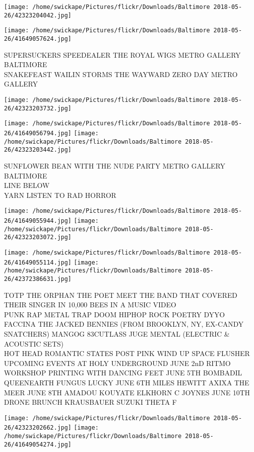 \documentclass[10pt,letterpaper]{article}
\begin{document}
\texttt{[image: /home/swickape/Pictures/flickr/Downloads/Baltimore 2018-05-26/42323204042.jpg]}

\vspace{0.25in}
\texttt{[image: /home/swickape/Pictures/flickr/Downloads/Baltimore 2018-05-26/41649057624.jpg]}

SUPERSUCKERS SPEEDEALER THE ROYAL WIGS METRO GALLERY BALTIMORE\\
SNAKEFEAST WAILIN STORMS THE WAYWARD ZERO DAY METRO GALLERY
\pagebreak

\texttt{[image: /home/swickape/Pictures/flickr/Downloads/Baltimore 2018-05-26/42323203732.jpg]}

\vspace{0.25in}
\texttt{[image: /home/swickape/Pictures/flickr/Downloads/Baltimore 2018-05-26/41649056794.jpg]}
\texttt{[image: /home/swickape/Pictures/flickr/Downloads/Baltimore 2018-05-26/42323203442.jpg]}

SUNFLOWER BEAN WITH THE NUDE PARTY METRO GALLERY BALTIMORE\\
LINE BELOW\\
YARN LISTEN TO RAD HORROR
\pagebreak

\texttt{[image: /home/swickape/Pictures/flickr/Downloads/Baltimore 2018-05-26/41649055944.jpg]}
\texttt{[image: /home/swickape/Pictures/flickr/Downloads/Baltimore 2018-05-26/42323203072.jpg]}

\texttt{[image: /home/swickape/Pictures/flickr/Downloads/Baltimore 2018-05-26/41649055114.jpg]}
\texttt{[image: /home/swickape/Pictures/flickr/Downloads/Baltimore 2018-05-26/42372386631.jpg]}

TOTP THE ORPHAN THE POET MEET THE BAND THAT COVERED THEIR SINGER IN 10,000 BEES IN A MUSIC VIDEO\\
PUNK RAP METAL TRAP DOOM HIPHOP ROCK POETRY DYYO FACCINA THE JACKED BENNIES (FROM BROOKLYN, NY, EX{-}CANDY SNATCHERS) MANGOG 83CUTLASS JUGE MENTAL (ELECTRIC \& ACOUSTIC SETS)\\
HOT HEAD ROMANTIC STATES POST PINK WIND UP SPACE FLUSHER\\
UPCOMING EVENTS AT HOLY UNDERGROUND JUNE 2nD RITMO WORKSHOP PRINTING WITH DANCING FEET JUNE 5TH BOMBADIL QUEENEARTH FUNGUS LUCKY JUNE 6TH MILES HEWITT AXIXA THE MEER JUNE 8TH AMADOU KOUYATE ELKHORN C JOYNES JUNE 10TH DRONE BRUNCH KRAUSBAUER SUZUKI THETA F
\pagebreak

\texttt{[image: /home/swickape/Pictures/flickr/Downloads/Baltimore 2018-05-26/42323202662.jpg]}
\texttt{[image: /home/swickape/Pictures/flickr/Downloads/Baltimore 2018-05-26/41649054274.jpg]}
\end{document}
